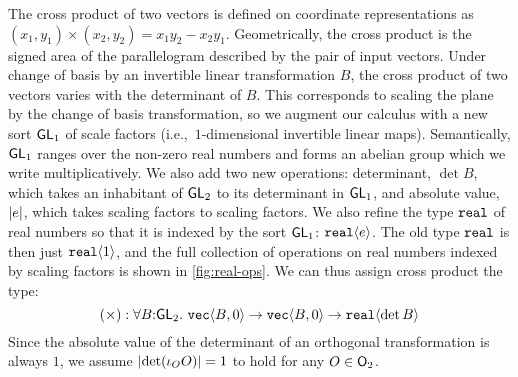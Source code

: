 The cross product of two vectors is defined on coordinate
representations as $(x_1,y_1) \times (x_2,y_2) = x_1y_2 - x_2y_1$.
Geometrically, the cross product is the signed area of the
parallelogram described by the pair of input vectors.  Under change of
basis by an invertible linear transformation $B$, the cross product of
two vectors varies with the determinant of $B$. This corresponds to
scaling the plane by the change of basis transformation, so we augment
our calculus with a new sort $\mathsf{GL}_1$ of scale factors
(i.e.,~$1$-dimensional invertible linear maps). Semantically,
$\mathsf{GL}_1$ ranges over the non-zero real numbers and forms an abelian
group which we write multiplicatively. We also add two new operations:
determinant, $\det B$, which takes an inhabitant of $\mathsf{GL}_2$ to its
determinant in $\mathsf{GL}_1$, and absolute value, $\lvert e \rvert$, which takes
scaling factors to scaling factors. We also refine the type
$\textup{\texttt{real}}$ of real numbers so that it is indexed by the sort
$\mathsf{GL}_1$: $\textup{\texttt{real}}\langle e \rangle$. The old type $\textup{\texttt{real}}$ is
then just $\textup{\texttt{real}}\langle 1 \rangle$, and the full collection of operations on
real numbers indexed by scaling factors is shown in
\autoref{fig:real-ops}. We can thus assign cross product the type:
\begin{displaymath}
  (\times) : \forall B \mathord: \mathsf{GL}_2.\ \textup{\texttt{vec}}\langle B,0 \rangle \to
  \textup{\texttt{vec}}\langle B,0 \rangle \to \textup{\texttt{real}}\langle \det B \rangle 
\end{displaymath}
Since the absolute value of the determinant of an orthogonal
transformation is always $1$, we assume $\lvert \det (\iota_O O) \rvert = 1$
to hold for any $O \in \mathsf{O}_2$.

